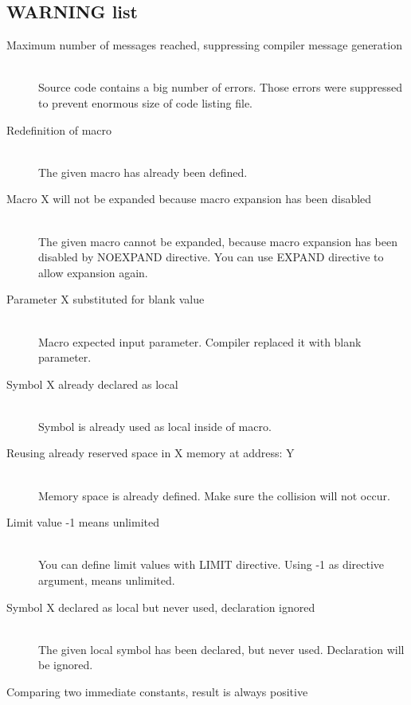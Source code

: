                  \subsection{WARNING list}
                    \begin{description}
                    \item[Maximum number of messages reached, suppressing compiler message generation] \hfill \\
                    Source code contains a big number of errors. Those errors were suppressed to prevent enormous size of code listing file.
                    \item[Redefinition of macro ] \hfill \\
                    The given macro has already been defined.
                    \item[Macro X will not be expanded because macro expansion has been disabled] \hfill \\
                    The given macro cannot be expanded, because macro expansion has been disabled by NOEXPAND directive.
                    You can use EXPAND directive to allow expansion again.
                    \item[Parameter X substituted for blank value ] \hfill \\     %
                    Macro expected input parameter. Compiler replaced it with blank parameter.
                    \item[Symbol X already declared as local ] \hfill \\
                    Symbol is already used as local inside of macro.   %
                    \item[Reusing already reserved space in X memory at address: Y] \hfill \\  %
                    Memory space is already defined. Make sure the collision will not occur.
                    \item[Limit value -1 means unlimited] \hfill \\
                    You can define limit values with LIMIT directive. Using -1 as directive argument, means unlimited.
                    \item[Symbol X declared as local but never used, declaration ignored] \hfill \\
                    The given local symbol has been declared, but never used. Declaration will be ignored.
                    \item[Comparing two immediate constants, result is always positive] \hfill \\

\end{description}
